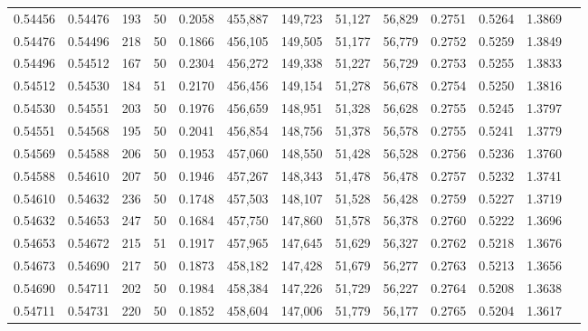 \begin{tabular}{rrrrrrrrrrrrr}
0.54456 & 0.54476 &   193 &  50 &                                     0.2058 & 455,887 & 149,723 &  51,127 &  56,829 & 0.2751 & 0.5264 & 1.3869 \\
0.54476 & 0.54496 &   218 &  50 &                                     0.1866 & 456,105 & 149,505 &  51,177 &  56,779 & 0.2752 & 0.5259 & 1.3849 \\
0.54496 & 0.54512 &   167 &  50 &                                     0.2304 & 456,272 & 149,338 &  51,227 &  56,729 & 0.2753 & 0.5255 & 1.3833 \\
0.54512 & 0.54530 &   184 &  51 &                                     0.2170 & 456,456 & 149,154 &  51,278 &  56,678 & 0.2754 & 0.5250 & 1.3816 \\
0.54530 & 0.54551 &   203 &  50 &                                     0.1976 & 456,659 & 148,951 &  51,328 &  56,628 & 0.2755 & 0.5245 & 1.3797 \\
0.54551 & 0.54568 &   195 &  50 &                                     0.2041 & 456,854 & 148,756 &  51,378 &  56,578 & 0.2755 & 0.5241 & 1.3779 \\
0.54569 & 0.54588 &   206 &  50 &                                     0.1953 & 457,060 & 148,550 &  51,428 &  56,528 & 0.2756 & 0.5236 & 1.3760 \\
0.54588 & 0.54610 &   207 &  50 &                                     0.1946 & 457,267 & 148,343 &  51,478 &  56,478 & 0.2757 & 0.5232 & 1.3741 \\
0.54610 & 0.54632 &   236 &  50 &                                     0.1748 & 457,503 & 148,107 &  51,528 &  56,428 & 0.2759 & 0.5227 & 1.3719 \\
0.54632 & 0.54653 &   247 &  50 &                                     0.1684 & 457,750 & 147,860 &  51,578 &  56,378 & 0.2760 & 0.5222 & 1.3696 \\
0.54653 & 0.54672 &   215 &  51 &                                     0.1917 & 457,965 & 147,645 &  51,629 &  56,327 & 0.2762 & 0.5218 & 1.3676 \\
0.54673 & 0.54690 &   217 &  50 &                                     0.1873 & 458,182 & 147,428 &  51,679 &  56,277 & 0.2763 & 0.5213 & 1.3656 \\
0.54690 & 0.54711 &   202 &  50 &                                     0.1984 & 458,384 & 147,226 &  51,729 &  56,227 & 0.2764 & 0.5208 & 1.3638 \\
0.54711 & 0.54731 &   220 &  50 &                                     0.1852 & 458,604 & 147,006 &  51,779 &  56,177 & 0.2765 & 0.5204 & 1.3617 \\

\end{tabular}
